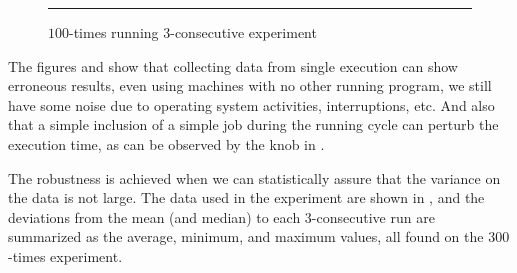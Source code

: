 \begin{figure}
  \centering
  \begin{minipage}[t]{\linewidth}
    \vspace{1em}
    \hrule
    \vspace{1em}
  \end{minipage}
  \caption{$100$-times running $3$-consecutive experiment}
  \label{fig:CProbust}
\end{figure}

The figures  and  show that collecting data from single execution can show erroneous results, even using machines with no other running program, we still have some noise due to operating system activities, interruptions, etc. And also that a simple inclusion of a simple job during the running cycle can perturb the execution time, as can be observed by the knob in .

The robustness is achieved when we can statistically assure that the variance on the data is not large.
The data used in the experiment are shown in , and the deviations from the mean (and median) to each $3$-consecutive run are summarized as the average, minimum, and maximum values, all found on the $300$-times experiment.

